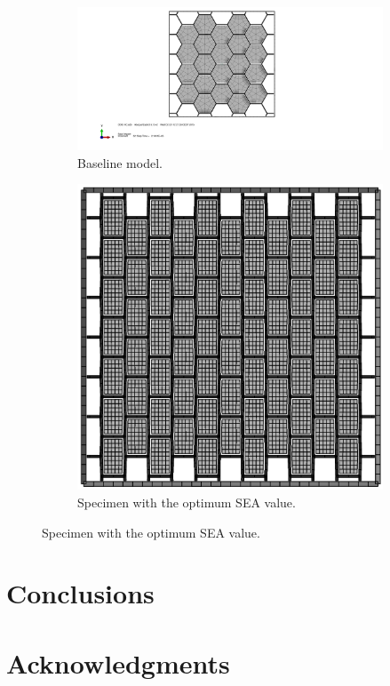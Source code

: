 \documentclass[cmfonts]{witpress}
\begin{document}
\begin{figure}[htpb]
\begin{subfigure}[b]{.45\columnwidth}
   \includegraphics[width=\columnwidth]{figures/IMG/sc1.pdf}
    \caption{Baseline model.}
    \label{fig:back0}
\end{subfigure}
\qquad
\begin{subfigure}[b]{.45\columnwidth}
   \includegraphics[width=\columnwidth]{figures/IMG/topview}
    \caption{Specimen with the optimum SEA value.}
    \label{fig:back5}
\end{subfigure}
\label{fig:opt_comparison}
\end{figure}




\section{Conclusions}
\section{Acknowledgments}




\end{document}
